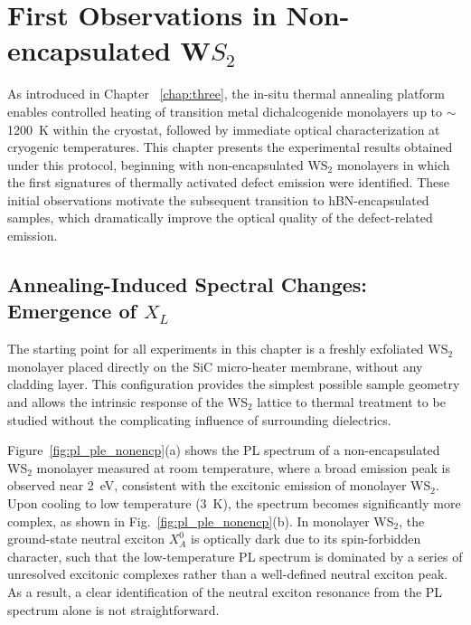 

\section{First Observations in Non-encapsulated W$S_2$}
\label{sec:First observations in Non-encapsluated WS2}

As introduced in Chapter ~\ref{chap:three}, the in-situ thermal annealing platform enables controlled heating of transition metal dichalcogenide monolayers up to $\sim$1200~K within the cryostat, followed by immediate optical characterization at cryogenic temperatures. This chapter presents the experimental results obtained under this protocol, beginning with non-encapsulated WS$_2$ monolayers in which the first signatures of thermally activated defect emission were identified. These initial observations motivate the subsequent transition to hBN-encapsulated samples, which dramatically improve the optical quality of the defect-related emission.


\subsection{Annealing-Induced Spectral Changes: Emergence of $X_L$}
\label{subsec:Annealing-Induced Spectral Changes: Emergence of $X_L$}

The starting point for all experiments in this chapter is a freshly exfoliated WS$_2$ monolayer placed directly on the SiC micro-heater membrane, without any cladding layer. This configuration provides the simplest possible sample geometry and allows the intrinsic response of the WS$_2$ lattice to thermal treatment to be studied without the complicating influence of surrounding dielectrics.

Figure~\ref{fig:pl_ple_nonencp}(a) shows the PL spectrum of a non-encapsulated WS$_2$ monolayer measured at room temperature, where a broad emission peak is observed near 2~eV, consistent with the excitonic emission of monolayer WS$_2$. Upon cooling to low temperature (3~K), the spectrum becomes significantly more complex, as shown in Fig.~\ref{fig:pl_ple_nonencp}(b). In monolayer WS$_2$, the ground-state neutral exciton $X_A^0$ is optically dark due to its spin-forbidden character, such that the low-temperature PL spectrum is dominated by a series of unresolved excitonic complexes rather than a well-defined neutral exciton peak. As a result, a clear identification of the neutral exciton resonance from the PL spectrum alone is not straightforward.

